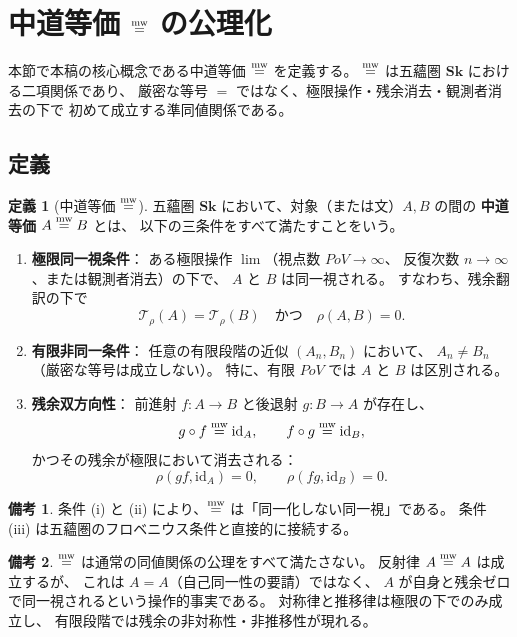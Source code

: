 \documentclass[11pt,a4paper]{article}
\theoremstyle{definition}
\newtheorem{definition}{定義}[section]
\newtheorem{remark}{備考}[section]
\newcommand{\Sk}{\mathbf{Sk}}
\newcommand{\PoV}{\mathit{PoV}}
\newcommand{\id}{\mathrm{id}}
\begin{document}
\section{中道等価 \texorpdfstring{$\mathrel{\overset{\mathrm{mw}}{=}}$}{mw-equivalence} の公理化}

本節で本稿の核心概念である中道等価 $\mathrel{\overset{\mathrm{mw}}{=}}$ を定義する。
$\mathrel{\overset{\mathrm{mw}}{=}}$ は五蘊圏 $\Sk$ における二項関係であり、
厳密な等号 $=$ ではなく、極限操作・残余消去・観測者消去の下で
初めて成立する準同値関係である。

\subsection{定義}

\begin{definition}[中道等価 $\mathrel{\overset{\mathrm{mw}}{=}}$]\label{def:mweq}
五蘊圏 $\Sk$ において、対象（または文）$A,B$ の間の
\textbf{中道等価} $A\mathrel{\overset{\mathrm{mw}}{=}} B$ とは、
以下の三条件をすべて満たすことをいう。
\begin{enumerate}[label=(\roman*)]
  \item \textbf{極限同一視条件}：
    ある極限操作 $\lim$（視点数 $\PoV\to\infty$、
    反復次数 $n\to\infty$、または観測者消去）の下で、
    $A$ と $B$ は同一視される。
    すなわち、残余翻訳の下で
    \[
    \mathcal{T}_\rho(A)=\mathcal{T}_\rho(B)
    \quad\text{かつ}\quad
    \rho(A,B)=0.
    \]
  \item \textbf{有限非同一条件}：
    任意の有限段階の近似 $(A_n,B_n)$ において、
    $A_n\neq B_n$（厳密な等号は成立しない）。
    特に、有限 $\PoV$ では $A$ と $B$ は区別される。
  \item \textbf{残余双方向性}：
    前進射 $f:A\to B$ と後退射 $g:B\to A$ が存在し、
    \[
    g\circ f \mweq \id_A,\qquad f\circ g \mweq \id_B,
    \]
    かつその残余が極限において消去される：
    \[
    \rho(gf,\id_A)=0,\qquad \rho(fg,\id_B)=0.
    \]
\end{enumerate}
\end{definition}

\begin{remark}
条件 (i) と (ii) により、$\mathrel{\overset{\mathrm{mw}}{=}}$ は「同一化しない同一視」である。
条件 (iii) は五蘊圏のフロベニウス条件と直接的に接続する。
\end{remark}

\begin{remark}
$\mathrel{\overset{\mathrm{mw}}{=}}$ は通常の同値関係の公理をすべて満たさない。
反射律 $A\mathrel{\overset{\mathrm{mw}}{=}} A$ は成立するが、
これは $A=A$（自己同一性の要請）ではなく、
$A$ が自身と残余ゼロで同一視されるという操作的事実である。
対称律と推移律は極限の下でのみ成立し、
有限段階では残余の非対称性・非推移性が現れる。
\end{remark}
\end{document}
